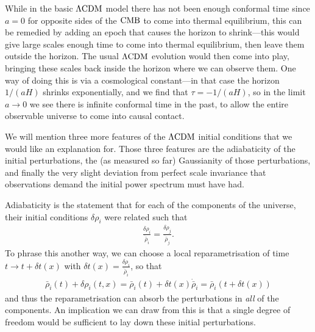     While in the basic $\Lambda\text{CDM}$ model there has not been enough conformal time since $a=0$ for
    opposite sides of the $\text{CMB}$ to come into thermal equilibrium, this can be remedied by
    adding an epoch that causes the horizon to shrink---this would give large scales enough time
    to come into thermal equilibrium, then leave them outside the horizon. The usual $\Lambda\text{CDM}$ evolution
    would then come into play, bringing these scales back inside the horizon where we can observe them.
    One way of doing this is via a cosmological constant---in that case the horizon $1/(aH)$ shrinks
    exponentially, and we find that $\tau=-1/(aH)$, so in the limit $a\rightarrow 0$ we see there is
    infinite conformal time in the past, to allow the entire observable universe to come into
    causal contact.




    We will mention three more features of the $\Lambda\text{CDM}$ initial conditions that we would
    like an explanation for. Those three features are the adiabaticity of the initial
    perturbations, the (as measured so far) Gaussianity of those perturbations, and finally
    the very slight deviation from perfect scale invariance that observations demand the
    initial power spectrum must have had.


    Adiabaticity is the statement that for each of the components of the universe, their
    initial conditions $\delta\rho_i$ were related such that
    \begin{align}
        \frac{\delta\rho_i}{\dot{\bar{\rho}}_i} = \frac{\delta\rho_j}{\dot{\bar{\rho}}_j}.
    \end{align}
    To phrase this another way, we can choose a local reparametrisation of time $t\rightarrow t+\delta t(x)$
    with $\delta t(x)=\frac{\delta\rho_i}{\dot{\bar{\rho}}_i}$, so that
    \begin{align}
        \bar{\rho}_i(t)+\delta \rho_i(t,x) = \bar{\rho}_i(t)+\delta t(x)\dot{\bar{\rho}}_i
        = \bar{\rho}_i(t+\delta t(x))
    \end{align}
    and thus the reparametrisation can absorb the perturbations in
    \textit{all} of the components.
    An implication we can draw from this is that a single degree of freedom
    would be sufficient to lay down these initial perturbations.


